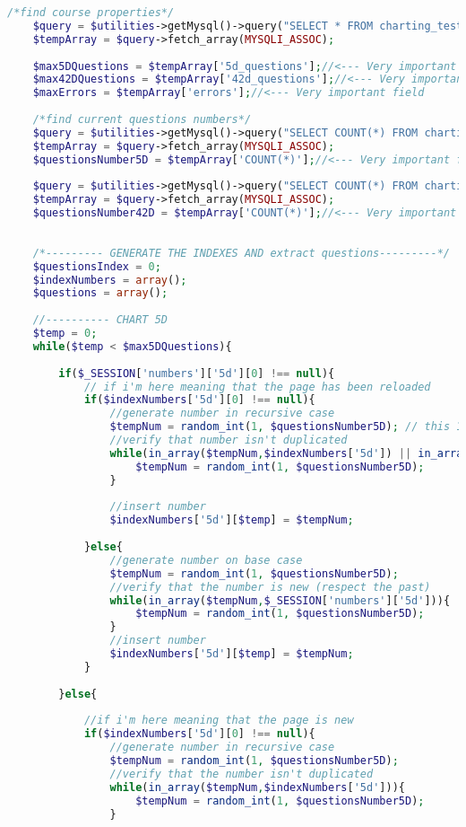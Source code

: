 \begin{lstlisting}[language=php]
	/*find course properties*/
	$query = $utilities->getMysql()->query("SELECT * FROM charting_test_properties WHERE (id = '1')");
	$tempArray = $query->fetch_array(MYSQLI_ASSOC);
	
	$max5DQuestions = $tempArray['5d_questions'];//<--- Very important field
	$max42DQuestions = $tempArray['42d_questions'];//<--- Very important field
	$maxErrors = $tempArray['errors'];//<--- Very important field
	
	/*find current questions numbers*/
	$query = $utilities->getMysql()->query("SELECT COUNT(*) FROM charting_test_5d");
	$tempArray = $query->fetch_array(MYSQLI_ASSOC);
	$questionsNumber5D = $tempArray['COUNT(*)'];//<--- Very important field
	
	$query = $utilities->getMysql()->query("SELECT COUNT(*) FROM charting_test_42d");
	$tempArray = $query->fetch_array(MYSQLI_ASSOC);
	$questionsNumber42D = $tempArray['COUNT(*)'];//<--- Very important field
	
	
	/*--------- GENERATE THE INDEXES AND extract questions---------*/
	$questionsIndex = 0;
	$indexNumbers = array();
	$questions = array();
	
	//---------- CHART 5D
	$temp = 0;
	while($temp < $max5DQuestions){
		
		if($_SESSION['numbers']['5d'][0] !== null){
			// if i'm here meaning that the page has been reloaded      
			if($indexNumbers['5d'][0] !== null){
				//generate number in recursive case
				$tempNum = random_int(1, $questionsNumber5D); // this 1 is because i know that the questions starts form 1 into db
				//verify that number isn't duplicated
				while(in_array($tempNum,$indexNumbers['5d']) || in_array($tempNum,$_SESSION['numbers']['5d'])){
					$tempNum = random_int(1, $questionsNumber5D);
				}
				
				//insert number
				$indexNumbers['5d'][$temp] = $tempNum; 
				
			}else{
				//generate number on base case
				$tempNum = random_int(1, $questionsNumber5D);
				//verify that the number is new (respect the past)
				while(in_array($tempNum,$_SESSION['numbers']['5d'])){
					$tempNum = random_int(1, $questionsNumber5D);
				}
				//insert number
				$indexNumbers['5d'][$temp] = $tempNum; 
			}
			
		}else{
			
			//if i'm here meaning that the page is new
			if($indexNumbers['5d'][0] !== null){
				//generate number in recursive case
				$tempNum = random_int(1, $questionsNumber5D);
				//verify that the number isn't duplicated
				while(in_array($tempNum,$indexNumbers['5d'])){
					$tempNum = random_int(1, $questionsNumber5D);
				}
				

\end{lstlisting}
